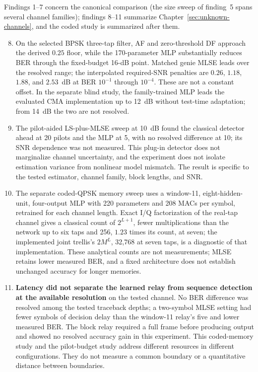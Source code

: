     Findings 1--7 concern the canonical comparison (the size sweep of finding~5 spans several channel families); findings 8--11 summarize Chapter~\ref{sec:unknown-channels}, and the coded study is summarized after them.
\begin{enumerate}
\setcounter{enumi}{7}
    \item On the selected BPSK three-tap filter, AF and zero-threshold DF approach the derived $0.25$ floor, while the 170-parameter MLP substantially reduces BER through the fixed-budget 16-dB point. Matched genie MLSE leads over the resolved range; the interpolated required-SNR penalties are $0.26$, $1.18$, $1.88$, and $2.53$~dB at BER $10^{-1}$ through $10^{-4}$. These are not a constant offset. In the separate blind study, the family-trained MLP leads the evaluated CMA implementation up to 12~dB without test-time adaptation; from 14~dB the two are not resolved.

    \item The pilot-aided LS-plus-MLSE sweep at 10~dB found the classical detector ahead at 20 pilots and the MLP at 5, with no resolved difference at 10; its SNR dependence was not measured. This plug-in detector does not marginalize channel uncertainty, and the experiment does not isolate estimation variance from nonlinear model mismatch. The result is specific to the tested estimator, channel family, block lengths, and SNR.

    \item The separate coded-QPSK memory sweep uses a window-11, eight-hidden-unit, four-output MLP with 220 parameters and 208 MACs per symbol, retrained for each channel length. Exact I/Q factorization of the real-tap channel gives a classical count of $2^{L+1}$, fewer multiplications than the network up to six taps and 256, $1.23$ times its count, at seven; the implemented joint trellis's $2M^L$, 32{,}768 at seven taps, is a diagnostic of that implementation. These analytical counts are not measurements; MLSE retains lower measured BER, and a fixed architecture does not establish unchanged accuracy for longer memories.

    \item \textbf{Latency did not separate the learned relay from sequence detection at the available resolution} on the tested channel. No BER difference was resolved among the tested traceback depths; a two-symbol MLSE setting had fewer symbols of decision delay than the window-11 relay's five and lower measured BER. The block relay required a full frame before producing output and showed no resolved accuracy gain in this experiment. This coded-memory study and the pilot-budget study address different resources in different configurations. They do not measure a common boundary or a quantitative distance between boundaries.
\end{enumerate}

